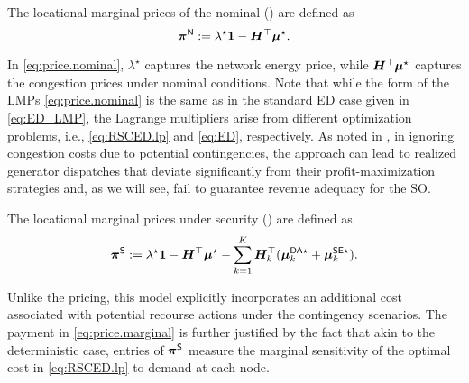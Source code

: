 \begin{definition}
  The locational marginal prices of the nominal (\LMPnom{}) are defined as
  \begin{equation}
      {\bm{\pi}}^{{\sf N}} := \lambda^\star \mathbf{1} - {\bm{H}}^\top {\bm{\mu}}^\star.
      \label{eq:price.nominal}
  \end{equation}
\end{definition}
In \eqref{eq:price.nominal}, $\lambda^\star$ captures the network energy price, while ${\bm{H}}^{\top}{\bm{\mu}}^{\star}$ captures the congestion prices under nominal conditions. Note that while the form of the LMPs \eqref{eq:price.nominal} is the same as in the standard ED case given in \eqref{eq:ED_LMP}, the Lagrange multipliers arise from different optimization problems, i.e., \eqref{eq:RSCED.lp} and \eqref{eq:ED}, respectively. 
As noted in \cite{hogan2013electricity}, in ignoring congestion costs due to potential contingencies, the \LMPnom{} approach can lead to realized generator dispatches that deviate significantly from their profit-maximization strategies and, as we will see, fail to guarantee revenue adequacy for the SO. 

\begin{definition}
  The locational marginal prices under security (\LMPmar{}) are defined as
  \begin{equation}
    {\bm{\pi}}^{{\sf S}} := \lambda^{\star} \mathbf{1} - {\bm{H}}^\top {\bm{\mu}}^\star - \sum_{k = 1}^K {\bm{H}}_k^\top ({\bm{\mu}}_k^{{\sf DA}{}\star} + {\bm{\mu}}_k^{{\sf SE}\star}).
    \label{eq:price.marginal}
  \end{equation}
\end{definition}
Unlike the \LMPnom{} pricing, this model explicitly incorporates an additional cost associated with potential recourse actions under the contingency scenarios. 
The payment in \eqref{eq:price.marginal} is further justified by the fact that akin to the deterministic case, entries of ${\bm{\pi}}^{{\sf S}}$
 measure the marginal sensitivity of the optimal cost in \eqref{eq:RSCED.lp} to demand at each node. 

